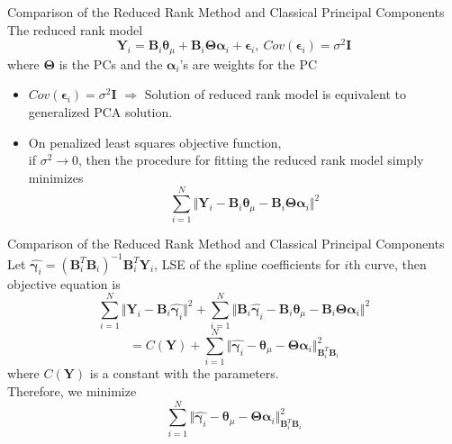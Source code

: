 \documentclass{beamer}
\def \bY {\mathbf{Y}}
\def \btheta {\boldsymbol{\theta}}
\def \bTheta {\boldsymbol{\Theta}}
\def \bepsilon {\boldsymbol{\epsilon}}
\def \balpha {\boldsymbol{\alpha}}
\def \bgamma {\boldsymbol{\gamma}}
\begin{document}
\begin{frame}{Comparison of the Reduced Rank Method and Classical Principal Components}
	The reduced rank model
	$$ \bY_i = \mathbf{B}_i\btheta_{\mu}+\mathbf{B}_i\bTheta\balpha_i + \bepsilon_i, \ Cov(\bepsilon_i)=\sigma^2\mathbf{I} $$
	where $\bTheta$ is the PCs and the $\balpha_i$'s are weights for the PC
	\begin{itemize}
		\item {
			$Cov(\bepsilon_i)=\sigma^2 \mathbf{I}$ $\Rightarrow$ Solution of reduced rank model is equivalent to generalized PCA solution.
		}
		\item {
			On penalized least squares objective function,\\ if $\sigma^2 \rightarrow 0$, then the procedure for fitting the reduced rank model simply minimizes
		$$ \sum_{i=1}^N \Vert \bY_i - \mathbf{B}_i\btheta_{\mu} - \mathbf{B}_i\bTheta\balpha_i \Vert^2  $$
		}
	\end{itemize}
\end{frame}

\begin{frame}{Comparison of the Reduced Rank Method and Classical Principal Components}
	Let $\hat{\bgamma_i}=(\mathbf{B}^T_i\mathbf{B}_i)^{-1}\mathbf{B}^T_i\bY_i$, LSE of the spline coefficients for $i$th curve, then objective equation is
	$$ \sum_{i=1}^N \Vert \bY_i - \mathbf{B}_i\hat{\bgamma_i} \Vert^2 + \sum_{i=1}^N \Vert \mathbf{B}_i\hat{\bgamma_i} - \mathbf{B}_i\btheta_{\mu} - \mathbf{B}_i\bTheta\balpha_i \Vert^2  $$
	$$ = C(\bY) + \sum_{i=1}^N \Vert \hat{\bgamma_i} - \btheta_{\mu} - \bTheta\balpha_i \Vert_{\mathbf{B}^T_i\mathbf{B}_i}^2 $$
	where $C(\bY)$ is a constant with the parameters.\\
	Therefore, we minimize
	$$ \sum_{i=1}^N \Vert \hat{\bgamma_i} - \btheta_{\mu} - \bTheta\balpha_i \Vert_{\mathbf{B}^T_i\mathbf{B}_i}^2 $$
\end{frame}
\end{document}
